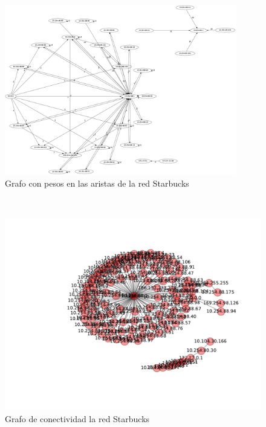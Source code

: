 \FloatBarrier

~

\begin{figure}[H]
	\center
	\includegraphics[width=0.9\textwidth]{resultados/starbucks/starbucks.png}
	\caption{Grafo con pesos en las aristas de la red Starbucks}
\end{figure}

~

\FloatBarrier

\begin{figure}[!h]
	\begin{center}
		  \includegraphics[scale=1.00]{resultados/starbucks/conectividadNX.pdf}
		  \caption{Grafo de conectividad la red Starbucks}
		  \label{fig:contra1}
	\end{center}
\end{figure}
	

